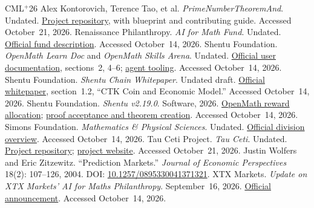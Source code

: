 \documentclass[11pt,a4paper,reqno]{amsart}
\numberwithin{equation}{section}
\begin{document}
\begin{thebibliography}{CML$^{+}$26}
 Alex Kontorovich, Terence Tao, et al. \emph{PrimeNumberTheoremAnd}. Undated. \href{https://github.com/AlexKontorovich/PrimeNumberTheoremAnd}{Project repository}, with blueprint and contributing guide. Accessed October~21, 2026.
 Renaissance Philanthropy. \emph{AI for Math Fund}. Undated. \href{https://www.renaissancephilanthropy.org/ai-for-math-fund/}{Official fund description}. Accessed October~14, 2026.
 Shentu Foundation. \emph{OpenMath Learn Doc} and \emph{OpenMath Skills Arena}. Undated. \href{https://github.com/shentufoundation/docs/blob/main/docs/openmath/openmath-learn-doc.md}{Official user documentation}, sections~2, 4--6; \href{https://github.com/shentufoundation/openmath-skills}{agent tooling}. Accessed October~14, 2026.
 Shentu Foundation. \emph{Shentu Chain Whitepaper}. Undated draft. \href{https://shentu.org/whitepaper}{Official whitepaper}, section~1.2, ``CTK Coin and Economic Model.'' Accessed October~14, 2026.
 Shentu Foundation. \emph{Shentu v2.19.0}. Software, 2026. \href{https://github.com/shentufoundation/shentu/blob/v2.19.0/x/bounty/keeper/funds.go}{OpenMath reward allocation}; \href{https://github.com/shentufoundation/shentu/blob/v2.19.0/x/bounty/keeper/msg_server.go}{proof acceptance and theorem creation}. Accessed October~14, 2026.
 Simons Foundation. \emph{Mathematics \& Physical Sciences}. Undated. \href{https://www.simonsfoundation.org/mathematics-physical-sciences/}{Official division overview}. Accessed October~14, 2026.
 Tau Ceti Project. \emph{Tau Ceti}. Undated. \href{https://github.com/TauCetiProject/TauCeti}{Project repository}; \href{https://taucetiproject.org}{project website}. Accessed October~21, 2026.
 Justin Wolfers and Eric Zitzewitz. ``Prediction Markets.'' \emph{Journal of Economic Perspectives} 18(2): 107--126, 2004. DOI: \href{https://doi.org/10.1257/0895330041371321}{10.1257/0895330041371321}.
 XTX Markets. \emph{Update on XTX Markets' AI for Maths Philanthropy}. September~16, 2026. \href{https://about.xtxmarkets.com/news/2026-update-on-xtx-markets-ai-philanthropy/}{Official announcement}. Accessed October~14, 2026.
\end{thebibliography}
\end{document}
